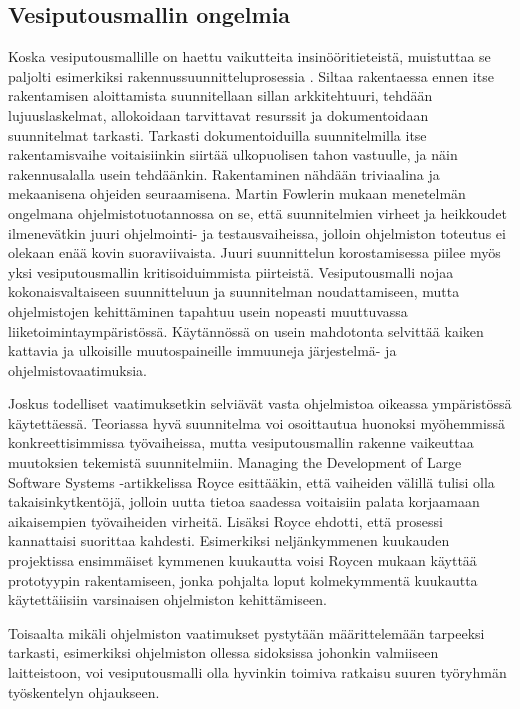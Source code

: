 \documentclass[finnish,12pt]{tktltiki2}
\theoremstyle{definition}
\theoremstyle{remark}
\begin{document}
\subsection{Vesiputousmallin ongelmia}

Koska vesiputousmallille on haettu vaikutteita insinööritieteistä, muistuttaa se paljolti esimerkiksi rakennussuunnitteluprosessia \cite{Sommerville10}. Siltaa rakentaessa ennen itse rakentamisen aloittamista suunnitellaan sillan arkkitehtuuri, tehdään lujuuslaskelmat, allokoidaan tarvittavat resurssit ja dokumentoidaan suunnitelmat tarkasti. Tarkasti dokumentoiduilla suunnitelmilla itse rakentamisvaihe voitaisiinkin siirtää ulkopuolisen tahon vastuulle, ja näin rakennusalalla usein tehdäänkin. \cite{Fowler05} Rakentaminen nähdään triviaalina ja mekaanisena ohjeiden seuraamisena. Martin Fowlerin mukaan menetelmän ongelmana ohjelmistotuotannossa on se, että suunnitelmien virheet ja heikkoudet ilmenevätkin juuri ohjelmointi- ja testausvaiheissa, jolloin ohjelmiston toteutus ei olekaan enää kovin suoraviivaista. Juuri suunnittelun korostamisessa piilee myös yksi vesiputousmallin kritisoiduimmista piirteistä. Vesiputousmalli nojaa kokonaisvaltaiseen suunnitteluun ja suunnitelman noudattamiseen, mutta ohjelmistojen kehittäminen tapahtuu usein nopeasti muuttuvassa liiketoimintaympäristössä. Käytännössä on usein mahdotonta selvittää kaiken kattavia ja ulkoisille muutospaineille immuuneja järjestelmä- ja ohjelmistovaatimuksia. \cite{Sommerville10} 

Joskus todelliset vaatimuksetkin selviävät vasta ohjelmistoa oikeassa ympäristössä käytettäessä. Teoriassa hyvä suunnitelma voi osoittautua huonoksi myöhemmissä konkreettisimmissa työvaiheissa, mutta vesiputousmallin rakenne vaikeuttaa muutoksien tekemistä suunnitelmiin. Managing the Development of Large Software Systems -artikkelissa \cite{Royce1970} Royce esittääkin, että vaiheiden välillä tulisi olla takaisinkytkentöjä, jolloin uutta tietoa saadessa voitaisiin palata korjaamaan aikaisempien työvaiheiden virheitä. Lisäksi Royce ehdotti, että prosessi kannattaisi suorittaa kahdesti. Esimerkiksi neljänkymmenen kuukauden projektissa ensimmäiset kymmenen kuukautta voisi Roycen mukaan käyttää prototyypin rakentamiseen, jonka pohjalta loput kolmekymmentä kuukautta käytettäiisiin varsinaisen ohjelmiston kehittämiseen.

Toisaalta mikäli ohjelmiston vaatimukset pystytään määrittelemään tarpeeksi tarkasti, esimerkiksi ohjelmiston ollessa sidoksissa johonkin valmiiseen laitteistoon, voi vesiputousmalli olla hyvinkin toimiva ratkaisu suuren työryhmän työskentelyn ohjaukseen.
\end{document}

